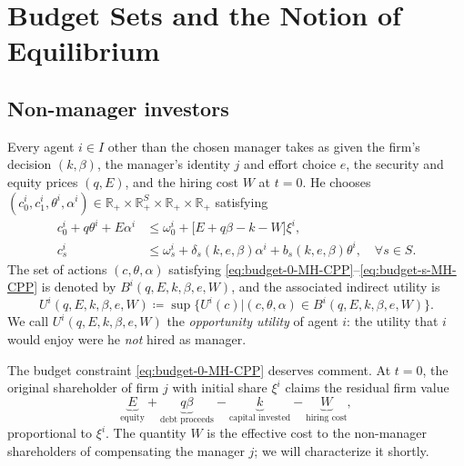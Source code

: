 \documentclass[11pt,a4paper,oneside]{book}
\def\R{\mathbb{R}}
\def\leq{\leqslant}
\theoremstyle{plain}
\theoremstyle{definition}
\theoremstyle{remark}
\numberwithin{equation}{chapter}
\begin{document}
\section{Budget Sets and the Notion of Equilibrium}
\label{sec:MH-CPP-budgets}

\subsection{Non-manager investors}

Every agent $i \in I$ other than the chosen manager takes as given the firm's decision $(k, \beta)$, the manager's identity $j$ and effort choice $e$, the security and equity prices $(q, E)$, and the hiring cost $W$ at $t=0$.
He chooses $(c^i_0, c^i_1, \theta^i, \alpha^i) \in \R_+ \times \R_+^S \times \R_+ \times \R_+$ satisfying
\begin{align}
  c^i_0 + q \theta^i + E \alpha^i
  &\leq \omega^i_0 + \bigl[ E + q \beta - k - W \bigr] \xi^i,
  \label{eq:budget-0-MH-CPP}\\[2pt]
  c^i_s
  &\leq \omega^i_s + \delta_s(k, e, \beta) \alpha^i + b_s(k, e, \beta) \theta^i, \quad \forall s \in S.
  \label{eq:budget-s-MH-CPP}
\end{align}
The set of actions $(c, \theta, \alpha)$ satisfying \eqref{eq:budget-0-MH-CPP}--\eqref{eq:budget-s-MH-CPP} is denoted by $B^i(q, E, k, \beta, e, W)$, and the associated indirect utility is
\begin{equation}\label{eq:opportunity-utility}
  U^i(q, E, k, \beta, e, W)
  \coloneqq \sup \bigl\{ U^i(c) \vert (c, \theta, \alpha) \in B^i(q, E, k, \beta, e, W) \bigr\}.
\end{equation}
We call $U^i(q, E, k, \beta, e, W)$ the \emph{opportunity utility} of agent $i$: the utility that $i$ would enjoy were he \emph{not} hired as manager.

The budget constraint \eqref{eq:budget-0-MH-CPP} deserves comment.
At $t=0$, the original shareholder of firm $j$ with initial share $\xi^i$ claims the residual firm value
\begin{equation*}
  \underbrace{E}_{\text{equity}} + \underbrace{q \beta}_{\text{debt proceeds}} - \underbrace{k}_{\text{capital invested}} - \underbrace{W}_{\text{hiring cost}},
\end{equation*}
proportional to $\xi^i$.
The quantity $W$ is the effective cost to the non-manager shareholders of compensating the manager $j$; we will characterize it shortly.
\end{document}
